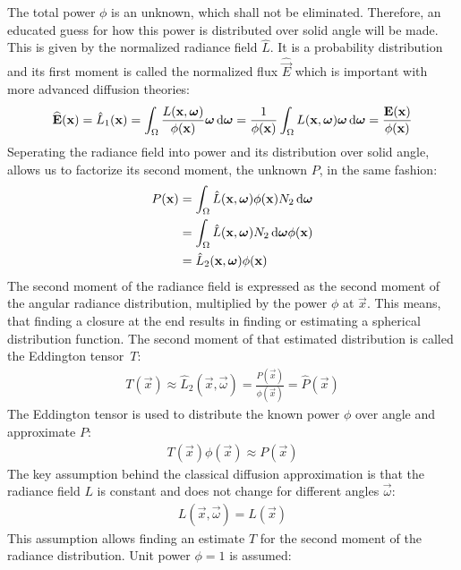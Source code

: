 The total power $\phi$ is an unknown, which shall not be eliminated. Therefore, an educated guess for how this power is distributed over solid angle will be made. This is given by the normalized radiance field $\hat{L}$. It is a probability distribution and its first moment is called the normalized flux $\widehat{\vec{E}}$ which is important with more advanced diffusion theories:
\begin{align*}
\widehat{\boldsymbol{\mathbf{E}}}(\boldsymbol{\mathbf{x}}) = \hat{L}_1(\boldsymbol{\mathbf{x}}) = \int_{\Omega}\frac{L(\boldsymbol{\mathbf{x}}, \boldsymbol{\mathbf{\omega}})}{\phi(\boldsymbol{\mathbf{x}})}\boldsymbol{\mathbf{\omega}}\,\mathrm{d}\boldsymbol{\mathbf{\omega}} = \frac{1}{\phi(\boldsymbol{\mathbf{x}})}\int_{\Omega}L(\boldsymbol{\mathbf{x}}, \boldsymbol{\mathbf{\omega}})\boldsymbol{\mathbf{\omega}}\,\mathrm{d}\boldsymbol{\mathbf{\omega}} = \frac{\boldsymbol{\mathbf{E}}(\boldsymbol{\mathbf{x}})}{\phi(\boldsymbol{\mathbf{x}})}
\end{align*}
Seperating the radiance field into power and its distribution over solid angle, allows us to factorize its second moment, the unknown $P$, in the same fashion:
\begin{align*}
P(\boldsymbol{\mathbf{x}}) &=
\int_{\Omega}{\hat{L}(\boldsymbol{\mathbf{x}}, \boldsymbol{\mathbf{\omega}})\phi(\boldsymbol{\mathbf{x}})N_2\,\mathrm{d}\boldsymbol{\mathbf{\omega}}}\\
&= \int_{\Omega}{\hat{L}(\boldsymbol{\mathbf{x}}, \boldsymbol{\mathbf{\omega}})N_2\,\mathrm{d}\boldsymbol{\mathbf{\omega}}}\phi(\boldsymbol{\mathbf{x}})\\
&= \hat{L}_2(\boldsymbol{\mathbf{x}}, \boldsymbol{\mathbf{\omega}})\phi(\boldsymbol{\mathbf{x}})
\end{align*}
The second moment of the radiance field is expressed as the second moment of the angular radiance distribution, multiplied by the power $\phi$ at $\vec{x}$. This means, that finding a closure at the end results in finding or estimating a spherical distribution function. The second moment of that estimated distribution is called the Eddington tensor~$T$:
\begin{align}
\label{eq:eddington_tensor}
T(\vec{x}) \approx \hat{L}_2(\vec{x}, \vec{\omega}) =
\frac{P(\vec{x})}{\phi(\vec{x})} =
\widehat{P}(\vec{x})
\end{align}
The Eddington tensor is used to distribute the known power $\phi$ over angle and approximate $P$:
\begin{align*}
T(\vec{x})\phi(\vec{x}) \approx 
P(\vec{x})
\end{align*}
The key assumption behind the classical diffusion approximation is that the radiance field $L$ is constant and does not change for different angles $\vec{\omega}$:
\begin{align*}
L(\vec{x}, \vec{\omega}) = L(\vec{x})
\end{align*}
This assumption allows finding an estimate $T$ for the second moment of the radiance distribution. Unit power $\phi = 1$ is assumed:
